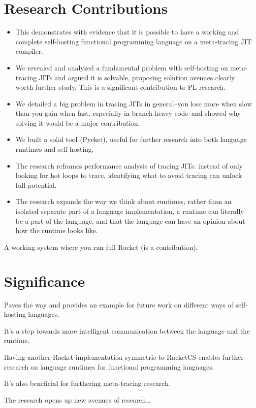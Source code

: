     \section{Research Contributions}
		\begin{mainpoint}
			\begin{itemize}
                \item This demonstrates with evidence that it is possible to have a working and complete self-hosting functional programming language on a meta-tracing JIT compiler.
                \item We revealed and analyzed a fundamental problem with self-hosting on meta-tracing JITs and argued it is solvable, proposing solution avenues clearly worth further study.  This is a significant contribution to PL research.
                \item We detailed a big problem in tracing JITs in general--you lose more when slow than you gain when fast, especially in branch-heavy code--and showed why solving it would be a major contribution.
                \item We built a solid tool (Pycket), useful for further research into both language runtimes and self-hosting.
                \item The research reframes performance analysis of tracing JITs: instead of only looking for hot loops to trace, identifying what to avoid tracing can unlock full potential.
                \item The research expands the way we think about runtimes, rather than an isolated separate part of a language implementation, a runtime can literally be a part of the language, and that the language can have an opinion about how the runtime looks like.
		    \end{itemize}
		\end{mainpoint}

		\begin{paragraph-here}
			A working system where you run full Racket (is a contribution).
		\end{paragraph-here}

    \section{Significance}
		\begin{mainpoint}
			Paves the way and provides an example for future work on
			different ways of self-hosting languages.

			It's a step towards more intelligent communication between
			the language and the runtime.

			Having another Racket implementation symmetric to RacketCS
			enables further research on language runtimes for functional
			programming languages.

			It's also beneficial for furthering meta-tracing research.

            The research opens up new avenues of research\dots
		\end{mainpoint}

